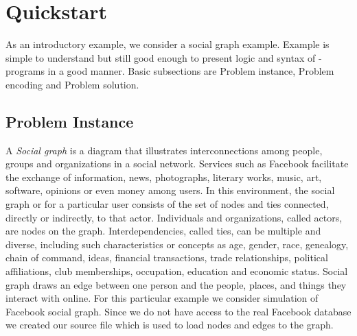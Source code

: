 \documentclass[14pt,a4paper, titlepage]{article}
\begin{document}
\section{Quickstart} %
As an introductory example, we consider a social graph example. Example is simple to understand  but still good enough to present logic and syntax of \hex{}-programs in a good manner. Basic subsections are Problem instance, Problem encoding and Problem solution.  

\subsection{Problem Instance}
A \emph{Social graph} is a diagram that illustrates interconnections among people, groups and organizations in a social network. Services such as Facebook facilitate the exchange of information, news, photographs, literary works, music, art, software, opinions or even money among users. In this environment, the social graph or for a particular user consists of the set of nodes and ties connected, directly or indirectly, to that actor. Individuals and organizations, called actors, are nodes on the graph. Interdependencies, called ties, can be multiple and diverse, including such characteristics or concepts as age, gender, race, genealogy, chain of command, ideas, financial transactions, trade relationships, political affiliations, club memberships, occupation, education and economic status. Social graph draws an edge between one person and the people, places, and things they interact with online. For this particular example we consider simulation of Facebook social graph. Since we do not have access to the real Facebook database we created our source file which is used to load nodes and edges to the graph. 
\end{document}
